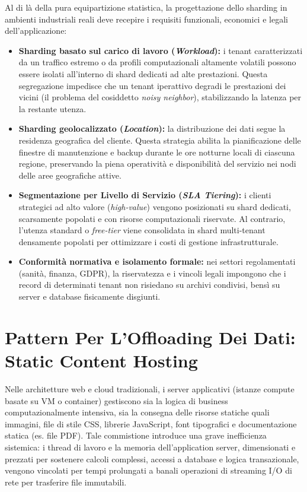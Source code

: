 \documentclass[11pt, a4paper]{article}
\begin{document}
Al di là della pura equipartizione statistica, la progettazione dello sharding in ambienti industriali reali deve recepire i requisiti funzionali, economici e legali dell'applicazione:
\begin{itemize}[noitemsep]
    \item \textbf{Sharding basato sul carico di lavoro (\emph{Workload}):} i tenant caratterizzati da un traffico estremo o da profili computazionali altamente volatili possono essere isolati all'interno di shard dedicati ad alte prestazioni. Questa segregazione impedisce che un tenant iperattivo degradi le prestazioni dei vicini (il problema del cosiddetto \emph{noisy neighbor}), stabilizzando la latenza per la restante utenza.
    \item \textbf{Sharding geolocalizzato (\emph{Location}):} la distribuzione dei dati segue la residenza geografica del cliente. Questa strategia abilita la pianificazione delle finestre di manutenzione e backup durante le ore notturne locali di ciascuna regione, preservando la piena operatività e disponibilità del servizio nei nodi delle aree geografiche attive.
    \item \textbf{Segmentazione per Livello di Servizio (\emph{SLA Tiering}):} i clienti strategici ad alto valore (\emph{high-value}) vengono posizionati su shard dedicati, scarsamente popolati e con risorse computazionali riservate. Al contrario, l'utenza standard o \emph{free-tier} viene consolidata in shard multi-tenant densamente popolati per ottimizzare i costi di gestione infrastrutturale.
    \item \textbf{Conformità normativa e isolamento formale:} nei settori regolamentati (sanità, finanza, GDPR), la riservatezza e i vincoli legali impongono che i record di determinati tenant non risiedano su archivi condivisi, bensì su server e database fisicamente disgiunti.
\end{itemize}

\newpage


\section{Pattern Per L'Offloading Dei Dati: Static Content Hosting}

Nelle architetture web e cloud tradizionali, i server applicativi (istanze compute basate su VM o container) gestiscono sia la logica di business computazionalmente intensiva, sia la consegna delle risorse statiche quali immagini, file di stile CSS, librerie JavaScript, font tipografici e documentazione statica (es. file PDF). Tale commistione introduce una grave inefficienza sistemica: i thread di lavoro e la memoria dell'application server, dimensionati e prezzati per sostenere calcoli complessi, accessi a database e logica transazionale, vengono vincolati per tempi prolungati a banali operazioni di streaming I/O di rete per trasferire file immutabili.
\end{document}
